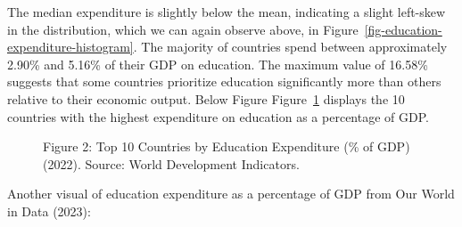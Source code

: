 \documentclass[
]{article}
\begin{document}
The median expenditure is slightly below the mean, indicating a slight
left-skew in the distribution, which we can again observe above, in
Figure~\ref{fig-education-expenditure-histogram}. The majority of
countries spend between approximately 2.90\% and 5.16\% of their GDP on
education. The maximum value of 16.58\% suggests that some countries
prioritize education significantly more than others relative to their
economic output. Below Figure Figure~\ref{fig-education-expenditure}
displays the 10 countries with the highest expenditure on education as a
percentage of GDP.

\begin{figure}


\caption{\label{fig-education-expenditure}Figure 2: Top 10 Countries by
Education Expenditure (\% of GDP) (2022). Source: World Development
Indicators.}

\end{figure}%

Another visual of education expenditure as a percentage of GDP from Our
World in Data (2023):
\end{document}
